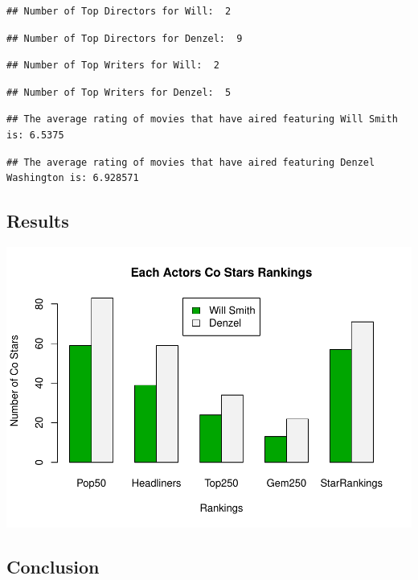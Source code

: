 \documentclass[]{article}
\begin{document}
\begin{verbatim}
## Number of Top Directors for Will:  2
\end{verbatim}

\begin{verbatim}
## Number of Top Directors for Denzel:  9
\end{verbatim}

\begin{verbatim}
## Number of Top Writers for Will:  2
\end{verbatim}

\begin{verbatim}
## Number of Top Writers for Denzel:  5
\end{verbatim}

\begin{verbatim}
## The average rating of movies that have aired featuring Will Smith is: 6.5375
\end{verbatim}

\begin{verbatim}
## The average rating of movies that have aired featuring Denzel Washington is: 6.928571
\end{verbatim}

\newpage
\subsection{Results}
\label{sec:results}
\vspace{10mm}

\includegraphics{will-v-denzel_files/figure-latex/codePlot-1.pdf}
\newpage \vspace{10mm}

\subsection{Conclusion}
\label{sec:conclusion}
\end{document}
